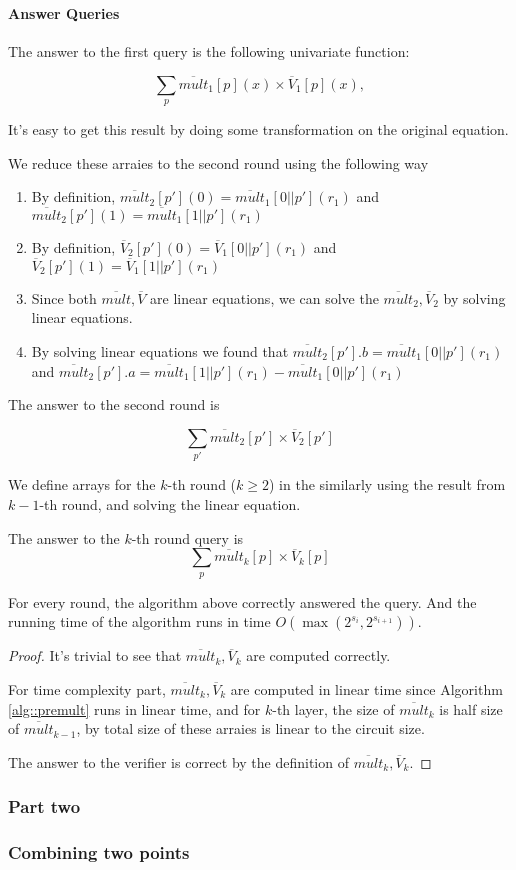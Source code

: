 \paragraph{Answer Queries}
The answer to the first query is the following univariate function:

$$\sum_{p}\overline{mult}_1[p](x)\times\overline{V}_1[p](x),$$

It's easy to get this result by doing some transformation on the original equation.

We reduce these arraies to the second round using the following way

\begin{enumerate}
	\item By definition, $\overline{mult}_2[p'](0)=\overline{mult}_1[0||p'](r_1)$ and $\overline{mult}_2[p'](1)=\overline{mult}_1[1||p'](r_1)$
	\item By definition, $\overline{V}_2[p'](0)=\overline{V}_1[0||p'](r_1)$ and $\overline{V}_2[p'](1)=\overline{V}_1[1||p'](r_1)$

	\item Since both $\overline{mult}, \overline{V}$ are linear equations, we can solve the $\overline{mult}_2, \overline{V}_2$ by solving linear equations.
	\item By solving linear equations we found that $\overline{mult}_2[p'].b=\overline{mult}_1[0||p'](r_1)$ and $\overline{mult}_2[p'].a=\overline{mult}_1[1||p'](r_1)-\overline{mult}_1[0||p'](r_1)$
\end{enumerate}

The answer to the second round is 

$$\sum_{p'}\overline{mult}_2[p']\times\overline{V}_2[p']$$

We define arrays for the $k$-th round ($k\ge 2$) in the similarly using the result from $k-1$-th round, and solving the linear equation.

The answer to the $k$-th round query is 
$$\sum_{p}\overline{mult}_k[p]\times\overline{V}_k[p]$$

\begin{theorem} For every round, the algorithm above correctly answered the query. And the running time of the algorithm runs in time $O(\max(2^{s_i}, 2^{s_{i+1}}))$.
\end{theorem}

\begin{proof}
It's trivial to see that $\overline{mult}_k, \overline{V}_k$ are computed correctly. 

For time complexity part, $\overline{mult}_k, \overline{V}_k$ are computed in linear time since Algorithm \ref{alg::premult} runs in linear time, and for $k$-th layer, the size of $\overline{mult}_k$ is half size of $\overline{mult}_{k-1}$, by total size of these arraies is linear to the circuit size.

The answer to the verifier is correct by the definition of $\overline{mult}_k, \overline{V}_k$.
\end{proof}

\subsubsection{Part two}

\subsubsection{Combining two points}